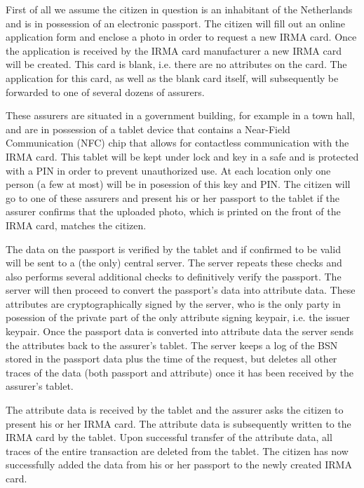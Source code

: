 First of all we assume the citizen in question is an inhabitant of the Netherlands and is in possession of an electronic passport. The citizen will fill out an online application form and enclose a photo in order to request a new IRMA card. Once the application is received by the IRMA card manufacturer a new IRMA card will be created. This card is blank, i.e. there are no attributes on the card. The application for this card, as well as the blank card itself, will subsequently be forwarded to one of several dozens of assurers. 

These assurers are situated in a government building, for example in a town hall, and are in possession of a tablet device that contains a Near-Field Communication (NFC) chip that allows for contactless communication with the IRMA card. This tablet will be kept under lock and key in a safe and is protected with a PIN in order to prevent unauthorized use. At each location only one person (a few at most) will be in posession of this key and PIN. The citizen will go to one of these assurers and present his or her passport to the tablet if the assurer confirms that the uploaded photo, which is printed on the front of the IRMA card, matches the citizen. 

The data on the passport is verified by the tablet and if confirmed to be valid will be sent to a (the only) central server. The server repeats these checks and also performs several additional checks to definitively verify the passport. The server will then proceed to convert the passport's data into attribute data. These attributes are cryptographically signed by the server, who is the only party in posession of the private part of the only attribute signing keypair, i.e. the issuer keypair. Once the passport data is converted into attribute data the server sends the attributes back to the assurer's tablet. The server keeps a log of the BSN stored in the passport data plus the time of the request, but deletes all other traces of the data (both passport and attribute) once it has been received by the assurer's tablet. 

The attribute data is received by the tablet and the assurer asks the citizen to present his or her IRMA card. The attribute data is subsequently written to the IRMA card by the tablet. Upon successful transfer of the attribute data, all traces of the entire transaction are deleted from the tablet. The citizen has now successfully added the data from his or her passport to the newly created IRMA card.
